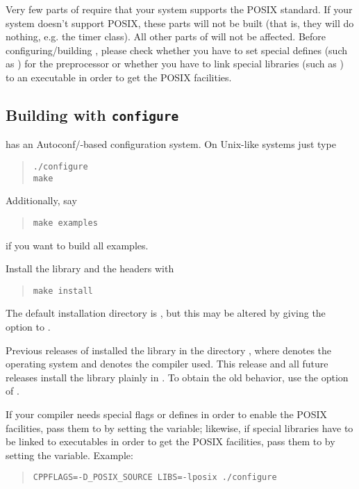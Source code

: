 \attentionI Very few parts of \LiDIA require that your system supports the
POSIX standard.  If your system doesn't support POSIX, these parts will not
be built (that is, they will do nothing, e.g. the timer class).  All other
parts of \LiDIA will not be affected.  Before configuring/building \LiDIA,
please check whether you have to set special defines (such as
) for the preprocessor or whether you have to link
special libraries (such as ) to an executable in order to
get the POSIX facilities.


\subsection{Building with \texttt{configure}}
\LiDIA has an Autoconf/-based configuration system.
On Unix-like systems just type
\begin{quote}
\begin{verbatim}
./configure
make
\end{verbatim}
\end{quote}
Additionally, say
\begin{quote}
\begin{verbatim}
make examples
\end{verbatim}
\end{quote}
if you want to build all examples.

Install the library and the headers with
\begin{quote}
\begin{verbatim}
make install
\end{verbatim}
\end{quote}
The default installation directory is , but this may be
altered by giving the  option to .

\attentionI Previous releases of \LiDIA installed the library in the
directory ,
where  denotes the operating system and
 denotes the compiler used.  This release and all
future releases install the library plainly in .  To
obtain the old behavior, use the  option of
.

\attentionI If your compiler needs special flags or defines in order to
enable the POSIX facilities, pass them to  by setting the
 variable; likewise, if special libraries have to be linked
to executables in order to get the POSIX facilities, pass them to
 by setting the  variable.  Example:
\begin{quote}
\begin{verbatim}
CPPFLAGS=-D_POSIX_SOURCE LIBS=-lposix ./configure
\end{verbatim}
\end{quote}


